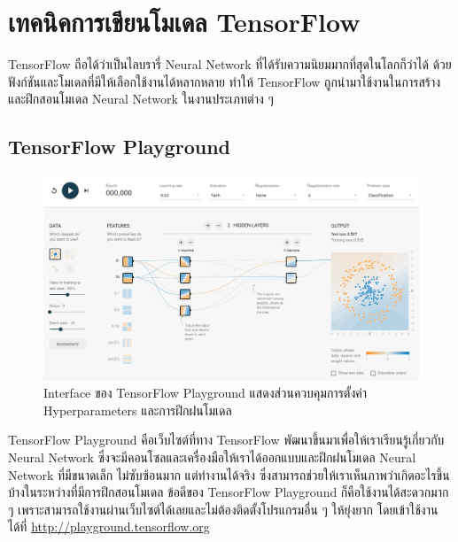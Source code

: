

\chapter{เทคนิคการเขียนโมเดล TensorFlow}
\label{ch:coding_tf}

TensorFlow ถือได้ว่าเป็นไลบรารี่ Neural Network ที่ได้รับความนิยมมากที่สุดในโลกก็ว่าได้ ด้วยฟังก์ชันและโมเดลที่มีให้เลือกใช้งานได้หลากหลาย ทำให้ TensorFlow ถูกนำมาใช้งานในการสร้างและฝึกสอนโมเดล Neural Network ในงานประเภทต่าง ๆ

\section{TensorFlow Playground}
\label{sec:tf_playground}

\begin{figure}[H]
    \centering
    \includegraphics[width=\linewidth]{fig/tf-playground.png}
    \caption{Interface ของ TensorFlow Playground แสดงส่วนควบคุมการตั้งค่า Hyperparameters และการฝึกฝนโมเดล}
    \label{fig:tf_playground}
\end{figure}

TensorFlow Playground คือเว็บไซต์ที่ทาง TensorFlow พัฒนาขึ้นมาเพื่อให้เราเรียนรู้เกี่ยวกับ Neural Network ซึ่งจะมีคอนโซลและเครื่องมือให้เราได้ออกแบบและฝึกฝนโมเดล Neural Network ที่มีขนาดเล็ก ไม่ซับซ้อนมาก แต่ทำงานได้จริง ซึ่งสามารถช่วยให้เราเห็นภาพว่าเกิดอะไรขึ้นบ้างในระหว่างที่มีการฝึกสอนโมเดล ข้อดีของ TensorFlow Playground ก็คือใช้งานได้สะดวกมาก ๆ เพราะสามารถใช้งานผ่านเว็บไซต์ได้เลยและไม่ต้องติดตั้งโปรแกรมอื่น ๆ ให้ยุ่งยาก โดยเข้าใช้งานได้ที่ \url{http://playground.tensorflow.org}

